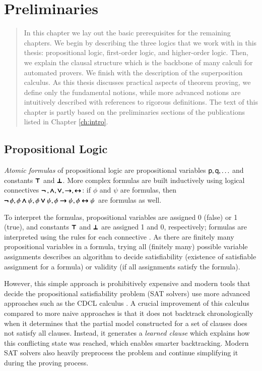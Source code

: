 \chapter{Preliminaries}
\label{ch:pre}

\begin{abstract}
    In this chapter we lay out the basic prerequisites for the remaining
    chapters. We begin by describing the three logics that we work with in this
    thesis: propositional logic, first-order logic, and higher-order logic. Then,
    we explain the clausal structure which is the backbone of many calculi for
    automated provers. We finish with the description of the superposition
    calculus. As this thesis discusses practical aspects of theorem proving, we
    define only the fundamental notions, while more advanced notions are
    intuitively described with references to rigorous definitions. The text of
    this chapter is partly based on the preliminaries sections of the
    publications listed in Chapter \ref{ch:intro}.
\end{abstract}
      
\newpage


\section{Propositional Logic}

\emph{Atomic formulas} of propositional logic are propositional variables
$\mathsf{p}, \mathsf{q}, \ldots$ and constants $\pmb{\top}$ and $\pmb{\bot}$. More complex
formulas are built inductively using logical connectives $\pmb{\neg\,}, \pmb{\land}, \pmb{\lor},
\pmb{\rightarrow}, \allowbreak \pmb{\leftrightarrow}$: if $\phi$ and $\psi$ are formulas, then $\pmb{\neg\,} \phi, \phi \pmb{\land}
\psi, \allowbreak \phi \pmb{\lor} \psi, \phi \pmb{\rightarrow} \psi, \phi \pmb{\leftrightarrow} \psi$ are formulas as well.

To interpret the formulas, propositional variables are assigned 0 (false) or 1
(true), and constants $\pmb{\top}$ and $\pmb{\bot}$ are assigned 1 and 0, respectively; formulas are interpreted using the rules for each connective
\cite[Sect.~1.4]{hr-00-logic-in-cs}. As there are finitely many propositional
variables in a formula, trying all (finitely many) possible variable assignments
describes an algorithm to decide satisfiability (existence of satisfiable
assignment for a formula) or validity (if all assignments satisfy the formula).

However, this simple approach is prohibitively expensive and modern tools that
decide the propositional satisfiability problem (SAT solvers) use more advanced
approaches such as the CDCL calculus \cite{mss-96-cdcl}. A crucial improvement of
this calculus compared to more naive approaches is that it does not backtrack
chronologically when it determines that the partial model constructed for a set
of clauses does not satisfy all clauses. Instead, it generates a \emph{learned
clause} which explains how this conflicting state was reached, which enables
smarter backtracking.   Modern SAT solvers also heavily preprocess the problem
and continue simplifying it during the proving process.

